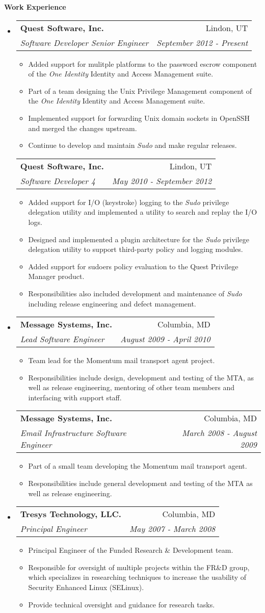 \documentclass[letterpaper,11pt]{article}
\makeatletter
\newcommand{\resitem}[1]{\item #1 \vspace{-2pt}}
\newcommand{\resheading}[1]{{\large \colorbox{mygrey}{\begin{minipage}{\textwidth}{\textbf{#1 \vphantom{p\^{E}}}}\end{minipage}}}}
\newcommand{\ressubheading}[4]{
\begin{tabular*}{7.0in}{l@{\extracolsep{\fill}}r}
		\textbf{#1} & #2 \\
		\textit{#3} & \textit{#4} \\
\end{tabular*}\vspace{-6pt}}
\makeatother
\begin{document}
\resheading{Work Experience}
\begin{itemize}
\item
	\ressubheading{Quest Software, Inc.}{Lindon, UT}{Software Developer Senior Engineer}{September 2012 - Present}
	\begin{itemize}
		\resitem{Added support for mulitple platforms to the password escrow component of the \emph{One Identity} Identity and Access Management suite.}
		\resitem{Part of a team designing the Unix Privilege Management component of the \emph{One Identity} Identity and Access Management suite.}
		\resitem{Implemented support for forwarding Unix domain sockets in OpenSSH and merged the changes upstream.}
		\resitem{Continue to develop and maintain \emph{Sudo} and make regular releases.}
	\end{itemize}
	\ressubheading{Quest Software, Inc.}{Lindon, UT}{Software Developer 4}{May 2010 - September 2012}
	\begin{itemize}
		\resitem{Added support for I/O (keystroke) logging to the \emph{Sudo} privilege delegation utility and implemented a utility to search and replay the I/O logs.}
		\resitem{Designed and implemented a plugin architecture for the \emph{Sudo} privilege delegation utility to support third-party policy and logging modules.}
		\resitem{Added support for sudoers policy evaluation to the Quest Privilege Manager product.}
		\resitem{Responsibilities also included development and maintenance of \emph{Sudo} including release engineering and defect management.}
	\end{itemize}
\item
	\ressubheading{Message Systems, Inc.}{Columbia, MD}{Lead Software Engineer}{August 2009 - April 2010}
	\begin{itemize}
		\resitem{Team lead for the Momentum mail transport agent project.}
		\resitem{Responsibilities include design, development and testing of the MTA, as well as release engineering, mentoring of other team members and interfacing with support staff.}
	\end{itemize}
	\ressubheading{Message Systems, Inc.}{Columbia, MD}{Email Infrastructure Software Engineer}{March 2008 - August 2009}
	\begin{itemize}
		\resitem{Part of a small team developing the Momentum mail transport agent.}
		\resitem{Responsibilities include general development and testing of the MTA as well as release engineering.}
	\end{itemize}

\item
	\ressubheading{Tresys Technology, LLC.}{Columbia, MD}{Principal Engineer}{May 2007 - March 2008}
	\begin{itemize}
		\resitem{Principal Engineer of the Funded Research \& Development team.}
		\resitem{Responsible for oversight of multiple projects within the FR\&D group, which specializes in researching techniques to increase the usability of Security Enhanced Linux (SELinux).}
		\resitem{Provide technical oversight and guidance for research tasks.}
	\end{itemize}


\end{itemize}
\end{document}
